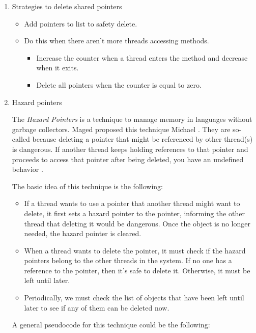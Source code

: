 \begin{enumerate}
\item Strategies to delete shared pointers
\label{sec:org36ce5a6}

\begin{itemize}
\item Add pointers to list to safety delete.
\item Do this when there aren't more threads accessing methods.
\begin{itemize}
\item Increase the counter when a thread enters the method and decrease when
it exits.
\item Delete all pointers when the counter is equal to zero.
\end{itemize}
\end{itemize}


\item Hazard pointers
\label{sec:org3992578}

The \emph{Hazard Pointers} is a technique to manage memory in languages without garbage collectors. Maged proposed this technique
Michael \cite{DBLP_journals_tpds_Michael04}. They are so-called because
deleting a pointer that might be referenced by other thread(s) is
dangerous. If another thread keeps holding references to that pointer and
proceeds to access that pointer after being deleted, you have an undefined
behavior \cite{DBLP_journals_tpds_Michael04}.

The basic idea of this technique is the following:

\begin{itemize}
\item If a thread wants to use a pointer that another thread might want to
delete, it first sets a hazard pointer to the pointer, informing the
other thread that deleting it would be dangerous. Once the object
is no longer needed, the hazard pointer is cleared.
\item When a thread wants to delete the pointer, it must check if the hazard
pointers belong to the other threads in the system. If no one has a
reference to the pointer, then it's safe to delete it. Otherwise, it must be left until later.
\item Periodically, we must check the list of objects that have been left until
later to see if any of them can be deleted now.
\end{itemize}

A general pseudocode for this technique could be the following:


\end{enumerate}
